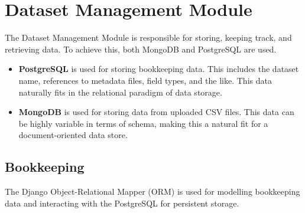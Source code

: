 
\section{Dataset Management Module}

The Dataset Management Module is responsible for storing, keeping track, and retrieving data. To achieve this, both MongoDB and PostgreSQL are used.

\begin{itemize}
\item \textbf{PostgreSQL} is used for storing bookkeeping data. This includes the dataset name, references to metadata files, field types, and the like. This data naturally fits in the relational paradigm of data storage.
\item \textbf{MongoDB} is used for storing data from uploaded CSV files. This data can be highly variable in terms of schema, making this a natural fit for a document-oriented data store.
\end{itemize}


\subsection{Bookkeeping}

The Django Object-Relational Mapper (ORM) is used for modelling bookkeeping data and interacting with the PostgreSQL for persistent storage.
